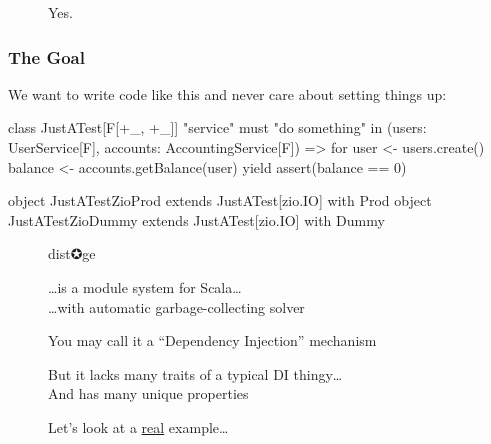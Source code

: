 \documentclass[usenames,dvipsnames]{beamer}
\begin{document}
\begin{frame}
  \begin{figure}
  \Huge Yes.
  \end{figure}
\end{frame}


\begin{frame}[fragile]
\frametitle{The Goal}

We want to write code like this and never care about setting things up:

\begin{scalacode}
class JustATest[F[+_, +_]] {
  "service" must {
    "do something" in {
      (users: UserService[F], accounts: AccountingService[F]) =>
      for {
        user  <- users.create()
        balance <- accounts.getBalance(user)
      } yield {
        assert(balance == 0)
      }
    }
  }
}

object JustATestZioProd extends JustATest[zio.IO] with Prod
object JustATestZioDummy extends JustATest[zio.IO] with Dummy
\end{scalacode}
\end{frame}

\begin{frame}
  \begin{figure}
  \Huge \color{RubineRed} dist✪ge
  \end{figure}

  \begin{figure}

  \huge \dots is a module system for Scala\dots \\
  \Large \dots with automatic garbage-collecting solver
  \end{figure}

  \begin{figure}
  \large You may call it a ``Dependency Injection'' mechanism
  \end{figure}

  \begin{figure}
  \large But it lacks many traits of a typical DI thingy\dots \\
  And has many unique properties
  \end{figure}
\end{frame}


\begin{frame}
  \begin{figure}
  \Huge Let's look at a \underline{real} example\dots
  \end{figure}
\end{frame}
\end{document}
